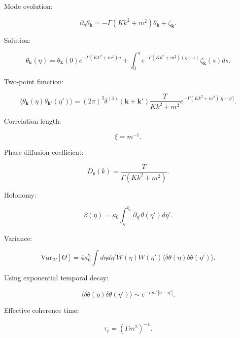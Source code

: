 \documentclass[12pt]{article}
\begin{document}
Mode evolution:

\begin{equation}
\partial_\eta \theta_{\mathbf{k}}
=
- \Gamma (K k^2 + m^2)\theta_{\mathbf{k}}
+
\zeta_{\mathbf{k}}.
\end{equation}

Solution:

\begin{equation}
\theta_{\mathbf{k}}(\eta)
=
\theta_{\mathbf{k}}(0)
e^{-\Gamma (Kk^2+m^2)\eta}
+
\int_0^\eta
e^{-\Gamma (Kk^2+m^2)(\eta-s)}
\zeta_{\mathbf{k}}(s)
ds.
\end{equation}

Two-point function:

\begin{equation}
\langle
\theta_{\mathbf{k}}(\eta)
\theta_{\mathbf{k}'}(\eta')
\rangle
=
(2\pi)^3 \delta^{(3)}(\mathbf{k}+\mathbf{k}')
\frac{T}{Kk^2+m^2}
e^{-\Gamma (Kk^2+m^2)|\eta-\eta'|}.
\end{equation}

Correlation length:

\begin{equation}
\xi = m^{-1}.
\end{equation}

Phase diffusion coefficient:

\begin{equation}
D_\theta(k)
=
\frac{T}{\Gamma (Kk^2+m^2)}.
\end{equation}

Holonomy:

\begin{equation}
\beta(\eta)
=
\kappa_0 \int_\eta^{\eta_0}
\partial_{\eta'} \theta(\eta') d\eta'.
\end{equation}

Variance:

\begin{equation}
\mathrm{Var}_W[\Theta]
=
4\kappa_0^2
\int d\eta d\eta'
W(\eta)W(\eta')
\langle
\delta\theta(\eta)
\delta\theta(\eta')
\rangle.
\end{equation}

Using exponential temporal decay:

\begin{equation}
\langle
\delta\theta(\eta)
\delta\theta(\eta')
\rangle
\sim
e^{-\Gamma m^2 |\eta-\eta'|}.
\end{equation}

Effective coherence time:

\begin{equation}
\tau_c
=
(\Gamma m^2)^{-1}.
\end{equation}
\end{document}
